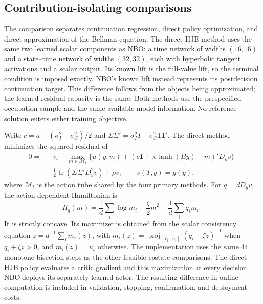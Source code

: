 \subsection{Contribution-isolating comparisons}
\label{sec:r15baselines}

The comparison separates continuation regression, direct policy optimization,
and direct approximation of the Bellman equation.  The direct HJB method uses
the same two learned scalar components as NBO: a time network of widths
$(16,16)$ and a state--time network of widths $(32,32)$, each with hyperbolic
tangent activations and a scalar output.  Its known lift is the full-value
lift, so the terminal condition is imposed exactly.  NBO's known lift instead
represents its postdecision continuation target.  This difference follows from
the objects being approximated; the learned residual capacity is the same.
Both methods use the prespecified occupation sample and the same available
model information.  No reference solution enters either training objective.

Write $c=a-(\sigma_I^2+\sigma_C^2)/2$ and
$\Sigma\Sigma'=\sigma_I^2I+\sigma_C^2\mathbf1\mathbf1'$.  The direct method
minimizes the squared residual of
\begin{equation}
 \begin{aligned}
 0={}&-v_t-\max_{m\in\mathcal M_t}
 \{u(y,m)+(c\mathbf1+\kappa\tanh(By)-m)'D_yv\}\\
 &-\tfrac12\operatorname{tr}(\Sigma\Sigma'D_y^2v)+\rho v,
 \qquad v(T,y)=g(y),
 \end{aligned}
 \label{eq:r15-direct-hjb}
\end{equation}
where $\mathcal M_t$ is the action tube shared by the four primary methods.
For $q=dD_yv$, the action-dependent Hamiltonian is
\begin{equation}
 H_q(m)=\frac1d\sum_i\log m_i-\frac\zeta2\bar m^2
          -\frac1d\sum_iq_i m_i.
 \label{eq:r15-hjb-hamiltonian}
\end{equation}
It is strictly concave.  Its maximizer is obtained from the scalar consistency
equation $z=d^{-1}\sum_i m_i(z)$, with
$m_i(z)=\operatorname{proj}_{[\ell_t,u_t]}(q_i+\zeta z)^{-1}$ when
$q_i+\zeta z>0$, and $m_i(z)=u_t$ otherwise.  The implementation uses the same
44 monotone bisection steps as the other feasible costate comparisons.
The direct HJB policy evaluates a critic gradient and this maximization at
every decision.  NBO deploys its separately learned actor.  The resulting
difference in online computation is included in validation, stopping,
confirmation, and deployment costs.

